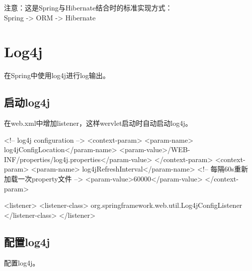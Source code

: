 \documentclass[a4paper,11pt]{article}
\begin{document}
注意：这是Spring与Hibernate结合时的标准实现方式：\\
Spring -> ORM -> Hibernate

\section[Log4j]{Log4j}
在Spring中使用log4j进行log输出。

\subsection[启动log4j]{启动log4j}
在web.xml中增加listener，这样wervlet启动时自动启动log4j。

\begin{xmlcode}
<!-- log4j configuration -->
<context-param> 
  <param-name> log4jConfigLocation</param-name> 
  <param-value>/WEB-INF/properties/log4j.properties</param-value> 
</context-param> 
<context-param> 
  <param-name> log4jRefreshInterval</param-name> 
  <!-- 每隔60s重新加载一次property文件 -->
  <param-value>60000</param-value> 
</context-param>

<listener> 
  <listener-class> 
    org.springframework.web.util.Log4jConfigListener 
  </listener-class> 
</listener>
\end{xmlcode}

\subsection[配置log4j]{配置log4j}
配置log4j。
\end{document}
